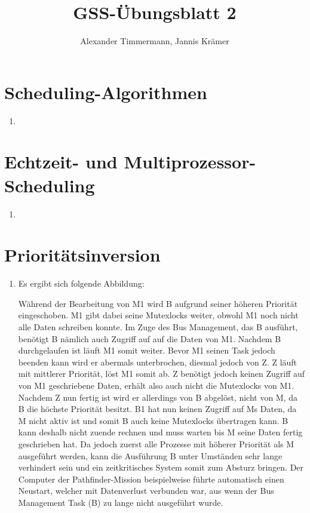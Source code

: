 \documentclass[a4paper,11pt]{scrartcl}
\author{Alexander Timmermann, Jannis Krämer}
\title{GSS-Übungsblatt 2}
\date{}
\begin{document}
\maketitle
\thispagestyle{empty}

\doublespace

\section{Scheduling-Algorithmen}

\begin{enumerate}[\bf a)]
    \item
\end{enumerate}

\section{Echtzeit- und Multiprozessor-Scheduling}

\begin{enumerate}[\bf a)]
    \item
\end{enumerate}

\section{Prioritätsinversion}

\begin{enumerate}[\bf a)]
    \item Es ergibt sich folgende Abbildung:
    \begin{center}
        \scalebox{0.4}{}
    \end{center}
    
    
    Während der Bearbeitung von M1 wird B aufgrund seiner höheren Priorität eingeschoben. M1 gibt dabei seine Mutexlocks weiter, obwohl M1 noch nicht alle Daten schreiben konnte. Im Zuge des Bus Management, das B ausführt, benötigt B nämlich auch Zugriff auf auf die Daten von M1. Nachdem B durchgelaufen ist läuft M1 somit weiter. Bevor M1 seinen Task jedoch beenden kann wird er abermals unterbrochen, diesmal jedoch von Z. Z läuft mit mittlerer Priorität, löst M1 somit ab. Z benötigt jedoch keinen Zugriff auf von M1 geschriebene Daten, erhält also auch nicht die Mutexlocks von M1. Nachdem Z nun fertig ist wird er allerdings von B abgelöst, nicht von M, da B die höchste Priorität besitzt. B1 hat nun keinen Zugriff auf Ms Daten, da M nicht aktiv ist und somit B auch keine Mutexlocks übertragen kann. B kann deshalb nicht zuende rechnen und muss warten bis M seine Daten fertig geschrieben hat. Da jedoch zuerst alle Prozesse mit höherer Priorität als M ausgeführt werden, kann die Ausführung B unter Umständen sehr lange verhindert sein und ein zeitkritisches System somit zum Absturz bringen. Der Computer der Pathfinder-Mission beispielweise führte automatisch einen Neustart, welcher mit Datenverlust verbunden war, aus wenn der Bus Management Task (B) zu lange nicht ausgeführt wurde. 
\end{enumerate}
\end{document}
